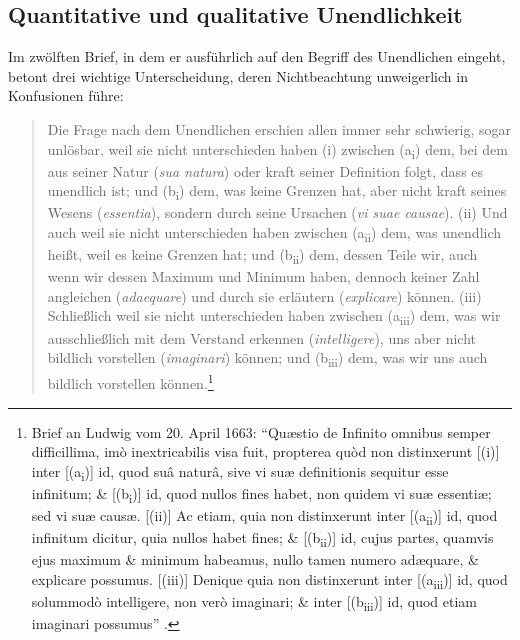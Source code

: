 \subsection{Quantitative und qualitative
Unendlichkeit}\label{subsection:QuantitativeundqualitativeUnendlichkeit}
Im zwölften Brief, in dem er ausführlich auf den Begriff des Unendlichen eingeht,
betont 
drei wichtige Unterscheidung, deren Nichtbeachtung unweigerlich in
Konfusionen führe:
\begin{quote}
Die Frage nach dem Unendlichen erschien allen immer sehr schwierig, sogar
unlösbar, weil sie nicht unterschieden haben (i) zwischen (a\textsubscript{i})
dem, bei dem aus seiner Natur (\emph{sua natura}) oder kraft seiner Definition
folgt, dass es unendlich ist; und (b\textsubscript{i}) dem, was keine Grenzen
hat, aber nicht kraft seines Wesens (\emph{essentia}), sondern durch seine Ursachen (\emph{vi
suae causae}). (ii) Und auch weil sie nicht unterschieden haben zwischen
(a\textsubscript{ii}) dem, was unendlich heißt, weil es keine Grenzen hat; und
(b\textsubscript{ii}) dem, dessen Teile wir, auch wenn wir dessen Maximum und
Minimum haben, dennoch keiner Zahl angleichen (\emph{adaequare}) und durch sie
erläutern (\emph{explicare}) können. (iii) Schließlich weil sie nicht
unterschieden haben zwischen (a\textsubscript{iii}) dem, was wir ausschließlich
mit dem Verstand erkennen (\emph{intelligere}), uns aber nicht bildlich
vorstellen (\emph{imaginari}) können; und (b\textsubscript{iii}) dem, was wir
uns auch bildlich vorstellen können.\footnote{Brief an Ludwig  vom
20. April 1663: \enquote{Qu{\ae}stio de Infinito omnibus semper difficillima,
im{\`o} inextricabilis visa fuit, propterea qu{\`o}d non distinxerunt [(i)] inter
[(a\textsubscript{i})] id, quod su{\^a} natur{\^a}, sive vi su{\ae} definitionis
sequitur esse infinitum; {\&} [(b\textsubscript{i})] id, quod nullos fines
habet, non quidem vi su{\ae} essenti{\ae}; sed vi su{\ae} caus{\ae}. [(ii)] Ac etiam,
quia non distinxerunt inter [(a\textsubscript{ii})] id, quod infinitum dicitur,
quia nullos habet fines; {\&} [(b\textsubscript{ii})] id, cujus partes, quamvis
ejus maximum {\&} minimum habeamus, nullo tamen numero ad{\ae}quare, {\&}
explicare possumus. [(iii)] Denique quia non distinxerunt inter
[(a\textsubscript{iii})] id, quod solummod{\`o} intelligere, non ver{\`o}
imaginari; {\&} inter [(b\textsubscript{iii})] id, quod etiam imaginari
possumus} \parencite[][IV:
53.1--10]{Spinoza:SpinozaOpera1972}.}
\end{quote}
